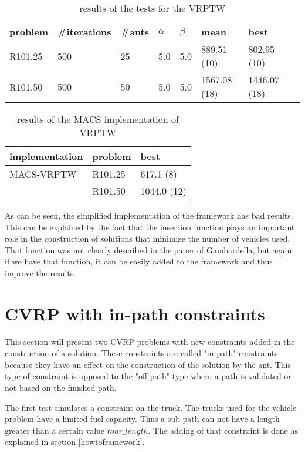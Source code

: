 \begin{table}[h!]
\centering
\small
\begin{tabular}{|l|l|l|l|l|l|l|l|}
\hline
problem & \#iterations & \#ants & $\alpha$ & $\beta$ & mean  & best \\
\hline
\hline
R101.25 & 500 & 25 & 5.0 & 5.0 & 889.51 (10) & 802.95 (10)  \\
\hline
R101.50 & 500 & 50 & 5.0 & 5.0 & 1567.08 (18) & 1446.07 (18)  \\
\hline
\end{tabular}
\caption{results of the tests for the VRPTW}
\label{tab:myvrptw}
\end{table}

\begin{table}[h!]
\centering
\begin{tabular}{|l|l|l|}
\hline
implementation & problem & best  \\
\hline
\hline
MACS-VRPTW & R101.25 & 617.1 (8) \\
& R101.50 & 1044.0 (12) \\
\hline
\end{tabular}
\caption{results of the MACS implementation of VRPTW}
\label{tab:macsvrptw}
\end{table}

As can be seen, the simplified implementation of the framework has bad results. This can be explained by the fact that the insertion function plays an important role in the construction of solutions that minimize the number of vehicles used. That function was not clearly described in the paper of Gambardella, but again, if we have that function, it can be easily added to the framework and thus improve the results.

\section{CVRP with in-path constraints}
This section will present two CVRP problems with new constraints added in the construction of a solution. These constraints are called "in-path" constraints because they have an effect on the construction of the solution by the ant. This type of constraint is opposed to the "off-path" type where a path is validated or not based on the finished path. 

The first test simulates a constraint on the truck. The trucks used for the vehicle problem have a limited fuel capacity. Thus a sub-path can not have a length greater than a certain value $tour\_length$. The adding of that constraint is done as explained in section \ref{howtoframework}. 

